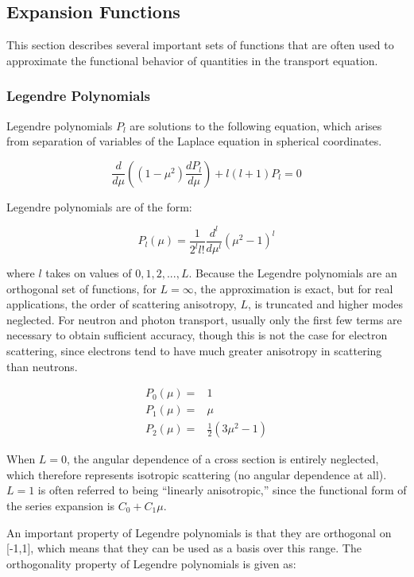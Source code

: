 \documentclass[10pt]{article}
\newcommand{\beq}{\begin{equation}}
\newcommand{\eeq}{\end{equation}}
\newcommand{\beqa}{\begin{equation}\begin{aligned}}
\newcommand{\eeqa}{\end{aligned}\end{equation}}
\begin{document}
\begin{flushleft}
\subsection{Expansion Functions}
This section describes several important sets of functions that are often used to approximate the functional behavior of quantities in the transport equation.

\subsubsection{Legendre Polynomials}

Legendre polynomials \(P_l\) are solutions to the following equation, which arises from  separation of variables of the Laplace equation in spherical coordinates.

\beq
\label{eq:LegendrePolynomialDiffEq}
\frac{d}{d\mu} \left((1-\mu^2) \frac{dP_l}{d\mu}\right) + l(l+1)P_l = 0
\eeq

Legendre polynomials are of the form:

\beq
\label{eq:LegendrePolynomialDefinitions}
P_l (\mu) = \frac{1}{2^l l!} \frac{d^l}{d\mu^l} \left(\mu^2 -1\right)^l
\eeq

where \(l\) takes on values of \(0, 1, 2, ..., L\). Because the Legendre polynomials are an orthogonal set of functions, for \(L=\infty\), the approximation is exact, but for real applications, the order of scattering anisotropy, \(L\), is truncated and higher modes neglected. For neutron and photon transport, usually only the first few terms are necessary to obtain sufficient accuracy, though this is not the case for electron scattering, since electrons tend to have much greater anisotropy in scattering than neutrons.

\beqa
\label{eqn:LegendrePolynomials_P0P1P2}
 P_0 (\mu) =& 1\\
 P_1 (\mu) =& \mu\\
 P_2 (\mu) =& \frac{1}{2} (3\mu^2 -1)
\eeqa

When \(L=0\), the angular dependence of a cross section is entirely neglected, which therefore represents isotropic scattering (no angular dependence at all). \(L=1\) is often referred to being ``linearly anisotropic,'' since the functional form of the series expansion is \(C_0+C_1\mu\).

An important property of Legendre polynomials is that they are orthogonal on [-1,1], which means that they can be used as a basis over this range. The orthogonality property of Legendre polynomials is given as:


\end{flushleft}
\end{document}
